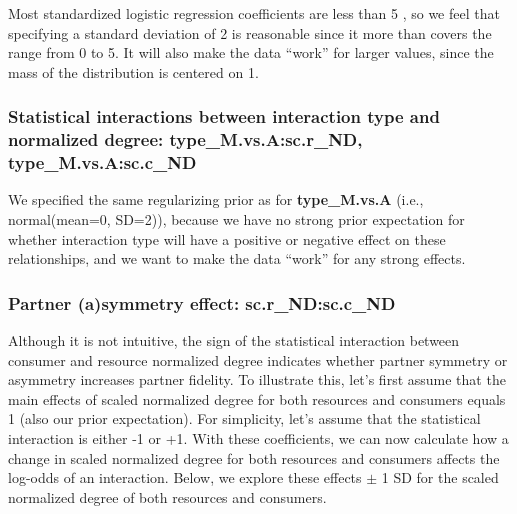 \documentclass[11pt,]{article}
\begin{document}
Most standardized logistic regression coefficients are less than 5
\citep{Gelman2008}, so we feel that specifying a standard deviation of 2
is reasonable since it more than covers the range from 0 to 5. It will
also make the data ``work'' for larger values, since the mass of the
distribution is centered on 1.

\subsubsection{\texorpdfstring{Statistical interactions between
interaction type and normalized degree: \textbf{type\_M.vs.A:sc.r\_ND},
\textbf{type\_M.vs.A:sc.c\_ND}}{Statistical interactions between interaction type and normalized degree: type\_M.vs.A:sc.r\_ND, type\_M.vs.A:sc.c\_ND}}\label{statistical-interactions-between-interaction-type-and-normalized-degree-type_m.vs.asc.r_nd-type_m.vs.asc.c_nd}

We specified the same regularizing prior as for \textbf{type\_M.vs.A}
(i.e., normal(mean=0, SD=2)), because we have no strong prior
expectation for whether interaction type will have a positive or
negative effect on these relationships, and we want to make the data
``work'' for any strong effects.

\hypertarget{asymmetry-effect}{\subsubsection{Partner (a)symmetry
effect: sc.r\_ND:sc.c\_ND}\label{asymmetry-effect}}

Although it is not intuitive, the sign of the statistical interaction
between consumer and resource normalized degree indicates whether
partner symmetry or asymmetry increases partner fidelity. To illustrate
this, let's first assume that the main effects of scaled normalized
degree for both resources and consumers equals 1 (also our prior
expectation). For simplicity, let's assume that the statistical
interaction is either -1 or +1. With these coefficients, we can now
calculate how a change in scaled normalized degree for both resources
and consumers affects the log-odds of an interaction. Below, we explore
these effects \(\pm\) 1 SD for the scaled normalized degree of both
resources and consumers.
\end{document}
